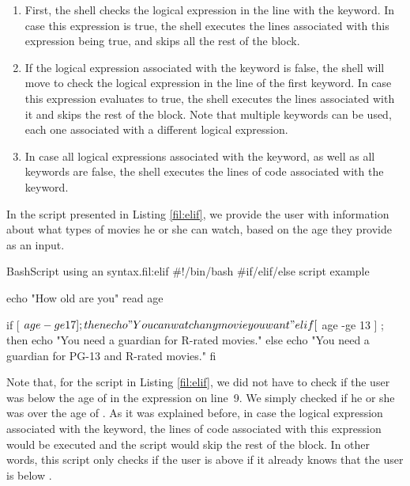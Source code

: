\begin{enumerate}
\item First, the shell checks the logical expression in the line with the  keyword. In case this expression is true, the shell executes the lines associated with this expression being true, and skips all the rest of the  block. 
\item If the logical expression associated with the  keyword is false, the shell will move to check the logical expression in the line of the first  keyword. In case this expression evaluates to true, the shell executes the lines associated with it and skips the rest of the  block. Note that multiple  keywords can be used, each one associated with a different logical expression. 
\item In case all logical expressions associated with the  keyword, as well as all  keywords are false, the shell executes the lines of code associated with the  keyword.
\end{enumerate}

In the script presented in Listing \ref{fil:elif}, we provide the user with information about what types of movies he or she can watch, based on the age they provide as an input. 

\begin{source_code_float}{Bash}{Script using an  syntax.}{fil:elif}
#!/bin/bash
#if/elif/else script example

echo "How old are you"
read age

if [ $age -ge 17 ] ; then
    echo "You can watch any movie you want"   
elif [ $ age -ge 13 ] ; then
    echo "You need a guardian for R-rated movies."   
else
    echo "You need a guardian for PG-13 and R-rated movies."   
fi
\end{source_code_float}

Note that, for the script in Listing \ref{fil:elif}, we did not have to check if the user was below the age of  in the  expression on line~9. We simply checked if he or she was over the age of . As it was explained before, in case the logical expression associated with the  keyword, the lines of code associated with this expression would be executed and the script would skip the rest of the  block. In other words, this script only checks if the user is above  if it already knows that the user is below .

